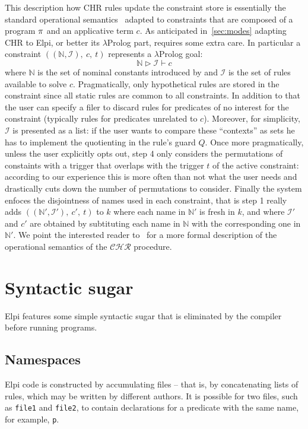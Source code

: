 \documentclass[a4paper, 11pt]{book}
\begin{document}
This description how CHR rules update the constraint store is
essentially the standard operational semantics~\cite{10.1007/978-3-540-27775-0_7}
adapted to constraints that are composed of a program ${\pi}$ and
an applicative term $c$. As anticipated in~\cref{sec:modes} adapting CHR to Elpi, or
better its $\lambda$Prolog part, requires some extra care. In particular
a constraint $((\mathbb{N},\mathcal{I}),\ c,\ t)$ represents a $\lambda$Prolog goal:
$$
\mathbb{N} \triangleright  \mathcal{I} \vdash c
$$
\noindent
where $\mathbb{N}$ is the set of nominal constants introduced by 
and $\mathcal{I}$ is the set of rules available to solve $c$.
Pragmatically, only hypothetical rules are stored in the constraint since all
static rules are common to all constraints. In addition to that the
user can specify a filer to discard rules for predicates of no interest for
the constraint (typically rules for predicates unrelated to $c$).
Moreover, for simplicity, $\mathcal{I}$ is presented as a list: if the
user wants to compare these ``contexts'' as sets he has to implement the
quotienting in the rule's guard $Q$. Once more pragmatically, unless
the user explicitly opts out, step 4 only considers the permutations of
constaints with a trigger that overlaps with the trigger $t$ of the active
constraint: according to our experience this is more often than not what
the user needs and drastically cuts down the number of permutations to consider.
Finally the system enfoces the disjointness of names used in each constraint, that
is step 1 really adds $((\mathbb{N'},\mathcal{I'}),\ c',\ t)$ to $k$
where each name in $\mathbb{N'}$ is fresh in $k$, and where
$\mathcal{I'}$ and $c'$ are obtained by subtituting each name in
$\mathbb{N}$ with the corresponding one in $\mathbb{N}'$.
We point the interested
reader to~\cite{TASSI_2019} for a more formal description of the
operational semantics of the $\mathcal{CHR}$ procedure.

\section{Syntactic sugar}


Elpi features some simple syntactic sugar that is eliminated by the compiler
before running programs.

\subsection{Namespaces}

Elpi code is constructed by accumulating files -- that is, by concatenating lists
of rules, which may be written by different authors. It is possible for two
files, such as \texttt{file1} and \texttt{file2}, to contain declarations for a
predicate with the same name, for example, \texttt{p}.
\end{document}
